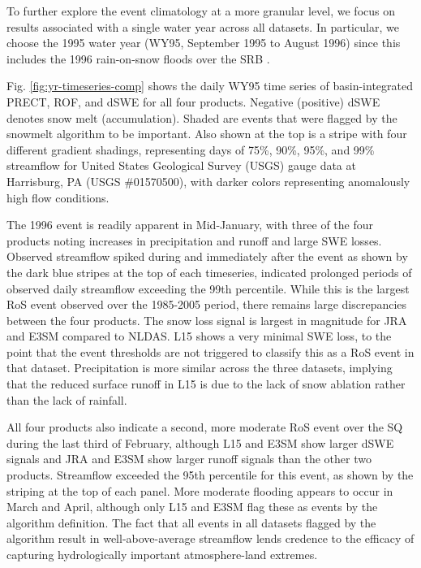 \documentclass[draft]{agujournal2019}
\begin{document}
To further explore the event climatology at a more granular level, we focus on results associated with a single water year across all datasets. In particular, we choose the 1995 water year (WY95, September 1995 to August 1996) since this includes the 1996 rain-on-snow floods over the SRB \citep{leathers1998severe}.

Fig. \ref{fig:yr-timeseries-comp} shows the daily WY95 time series of basin-integrated PRECT, ROF, and dSWE for all four products. Negative (positive) dSWE denotes snow melt (accumulation). Shaded are events that were flagged by the snowmelt algorithm to be important. Also shown at the top is a stripe with four different gradient shadings, representing days of 75\%, 90\%, 95\%, and 99\% streamflow for United States Geological Survey (USGS) gauge data at Harrisburg, PA (USGS \#01570500), with darker colors representing anomalously high flow conditions.

The 1996 event is readily apparent in Mid-January, with three of the four products noting increases in precipitation and runoff and large SWE losses. Observed streamflow spiked during and immediately after the event as shown by the dark blue stripes at the top of each timeseries, indicated prolonged periods of observed daily streamflow exceeding the 99th percentile. While this is the largest RoS event observed over the 1985-2005 period, there remains large discrepancies between the four products. The snow loss signal is largest in magnitude for JRA and E3SM compared to NLDAS. L15 shows a very minimal SWE loss, to the point that the event thresholds are not triggered to classify this as a RoS event in that dataset. Precipitation is more similar across the three datasets, implying that the reduced surface runoff in L15 is due to the lack of snow ablation rather than the lack of rainfall.

All four products also indicate a second, more moderate RoS event over the SQ during the last third of February, although L15 and E3SM show larger dSWE signals and JRA and E3SM show larger runoff signals than the other two products. Streamflow exceeded the 95th percentile for this event, as shown by the striping at the top of each panel. More moderate flooding appears to occur in March and April, although only L15 and E3SM flag these as events by the algorithm definition. The fact that all events in all datasets flagged by the algorithm result in well-above-average streamflow lends credence to the efficacy of capturing hydrologically important atmosphere-land extremes.
\end{document}
